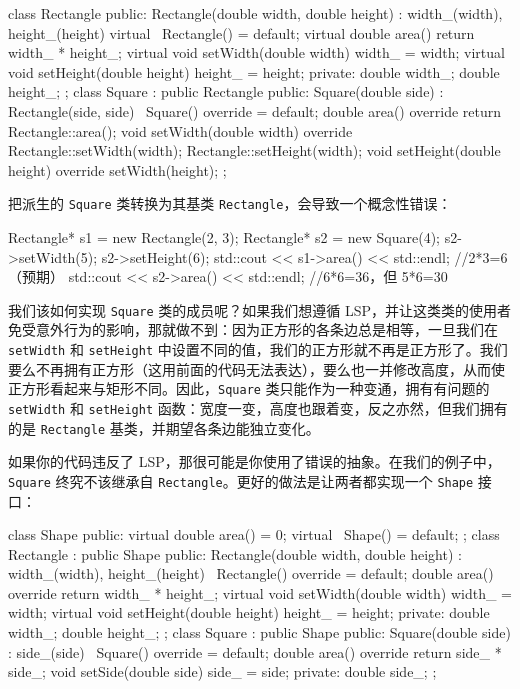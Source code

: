 \begin{codebox}[cpp]
class Rectangle {
public:
    Rectangle(double width, double height) : width_(width), height_(height) {}
    virtual ~Rectangle() = default;
    virtual double area() { return width_ * height_; }
    virtual void setWidth(double width) { width_ = width; }
    virtual void setHeight(double height) { height_ = height; }
private:
    double width_;
    double height_;
};
class Square : public Rectangle {
public:
    Square(double side) : Rectangle(side, side) {}
    ~Square() override = default;
    double area() override { return Rectangle::area(); }
    void setWidth(double width) override {
        Rectangle::setWidth(width);
        Rectangle::setHeight(width);
    }
    void setHeight(double height) override { setWidth(height); }
};
\end{codebox}

把派生的 \texttt{Square} 类转换为其基类 \texttt{Rectangle}，会导致一个概念性错误：

\begin{codebox}[cpp]
Rectangle* s1 = new Rectangle(2, 3);
Rectangle* s2 = new Square(4);
s2->setWidth(5);
s2->setHeight(6);
std::cout << s1->area() << std::endl;  //2*3=6（预期）
std::cout << s2->area() << std::endl;  //6*6=36，但 5*6=30
\end{codebox}

我们该如何实现 \texttt{Square} 类的成员呢？如果我们想遵循 LSP，并让这类类的使用者免受意外行为的影响，那就做不到：因为正方形的各条边总是相等，一旦我们在 \texttt{setWidth} 和 \texttt{setHeight} 中设置不同的值，我们的正方形就不再是正方形了。我们要么不再拥有正方形（这用前面的代码无法表达），要么也一并修改高度，从而使正方形看起来与矩形不同。因此，\texttt{Square} 类只能作为一种变通，拥有有问题的 \texttt{setWidth} 和 \texttt{setHeight} 函数：宽度一变，高度也跟着变，反之亦然，但我们拥有的是 \texttt{Rectangle} 基类，并期望各条边能独立变化。

\label{idx:046}
\label{idx:047}
如果你的代码违反了 LSP，那很可能是你使用了错误的抽象。在我们的例子中，\texttt{Square} 终究不该继承自 \texttt{Rectangle}。更好的做法是让两者都实现一个 \texttt{Shape} 接口：

\begin{codebox}[cpp]
class Shape {
public:
    virtual double area() = 0;
    virtual ~Shape() = default;
};
class Rectangle : public Shape {
public:
    Rectangle(double width, double height) : width_(width), height_(height) {}
    ~Rectangle() override = default;
    double area() override { return width_ * height_; }
    virtual void setWidth(double width) { width_ = width; }
    virtual void setHeight(double height) { height_ = height; }
private:
    double width_;
    double height_;
};
class Square : public Shape {
public:
    Square(double side) : side_(side) {}
    ~Square() override = default;
    double area() override { return side_ * side_; }
    void setSide(double side) { side_ = side; }
private:
    double side_;
};
\end{codebox}


